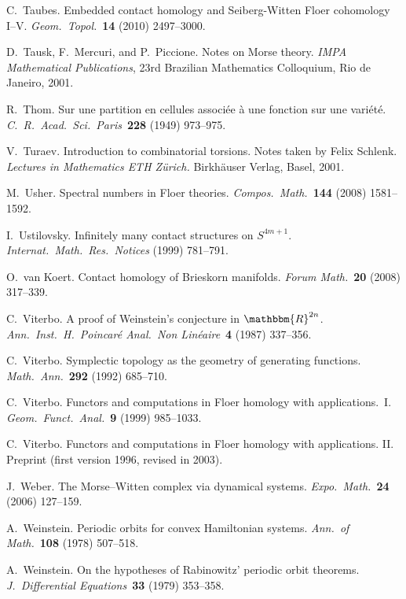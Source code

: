 \documentclass[12pt,twoside]{amsart}
\theoremstyle{plain}
\numberwithin{figure}{section}
\numberwithin{equation}{section}
\def\RR{\mathbbm{R}}
\begin{document}
\begin{thebibliography}{999}
C.\ Taubes. 
Embedded contact homology and Seiberg-Witten Floer cohomology I--V. 
{\it Geom.\ Topol.}~{\bf 14} (2010) 2497--3000. 

D.\ Tausk, F.\ Mercuri, and P.\ Piccione.
Notes on Morse theory. 
{\it IMPA Mathematical Publications}, 
23rd Brazilian Mathematics Colloquium, Rio de Janeiro, 2001.

R.\ Thom.
Sur une partition en cellules associ\'ee \`a une fonction sur une vari\'et\'e. 
{\it C.\ R.\ Acad.\ Sci.\ Paris}~{\bf 228} (1949) 973--975.

V.\ Turaev.
Introduction to combinatorial torsions. Notes taken by Felix Schlenk. 
{\it Lectures in Mathematics ETH Z\"urich.} 
Birkh\"auser Verlag, Basel, 2001. 

M.\ Usher. 
Spectral numbers in Floer theories. 
{\it Compos.\ Math.}~{\bf 144} (2008) 1581--1592.

I.\ Ustilovsky.
Infinitely many contact structures on $S^{4m+1}$. 
{\it Internat.\ Math.\ Res.\ Notices} (1999) 781--791.

O.\ van Koert.
Contact homology of Brieskorn manifolds. 
{\it Forum Math.}~{\bf 20} (2008) 317--339.

C.\ Viterbo.
A proof of Weinstein's conjecture in $\RR^{2n}$. 
{\it Ann.\ Inst.\ H.\ Poincar\'e Anal.\ Non Lin\'eaire}~{\bf 4} (1987) 337--356.

C.\ Viterbo.
Symplectic topology as the geometry of generating functions. 
{\it Math.\ Ann.}~{\bf 292} (1992) 685--710.

C.\ Viterbo.
Functors and computations in Floer homology with applications.~I. 
{\it Geom.\ Funct.\ Anal.}~{\bf 9} (1999) 985--1033. 

C.\ Viterbo.
Functors and computations in Floer homology with applications. II.
Preprint (first version 1996, revised in 2003).

J.\ Weber.
The Morse--Witten complex via dynamical systems.
{\it  Expo.\ Math.}~{\bf 24} (2006) 127--159.

A.\ Weinstein.
Periodic orbits for convex Hamiltonian systems. 
{\it Ann.\ of Math.}~{\bf 108} (1978) 507--518. 

A.\ Weinstein. 
On the hypotheses of Rabinowitz' periodic orbit theorems. 
{\it J.\ Differential Equations}~{\bf 33} (1979) 353--358.


\end{thebibliography}
\end{document}
